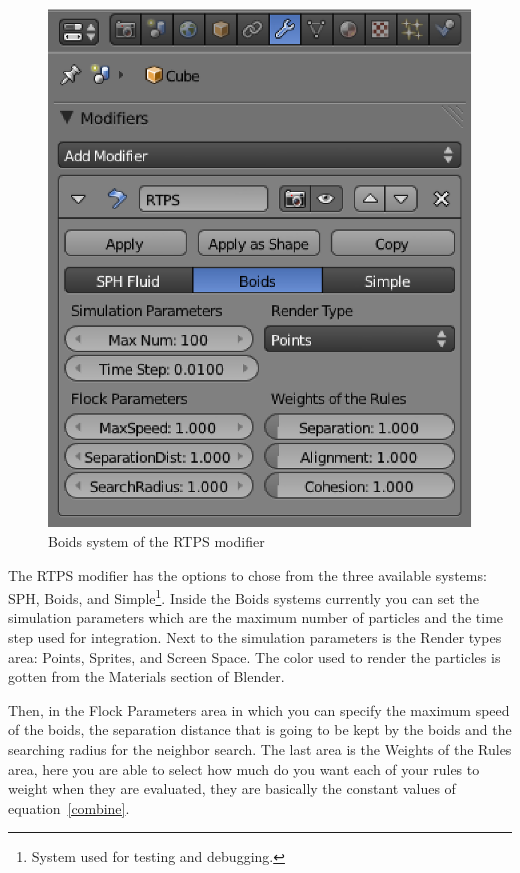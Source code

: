 \begin{figure}[htbp]
\begin{center}
\includegraphics[scale=0.8]{figures/modifier.eps}
\caption{Boids system of the RTPS modifier}
\label{ui}
\end{center}
\end{figure}

The RTPS modifier has the options to chose from the three available systems: SPH, Boids, and Simple\footnote{System used for testing and debugging.}. Inside the Boids systems currently you can set the simulation parameters which are the maximum number of particles and the time step used for integration.  Next to the simulation parameters is the Render types area: Points, Sprites, and Screen Space. The color used to render the particles is gotten from the Materials section of Blender.

Then, in the Flock Parameters area in which you can specify the maximum speed of the boids, the separation distance that is going to be kept by the boids and the searching radius for the neighbor search. The last area is the Weights of the Rules area, here you are able to select how much do you want each of your rules to weight when they are evaluated, they are basically the constant values of equation~\ref{combine}.

